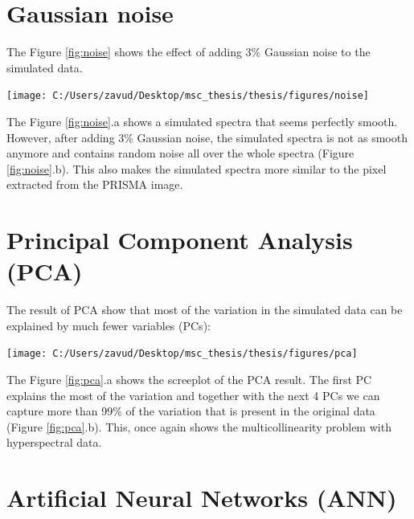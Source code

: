 \documentclass[a4paper, twoside]{templates/ociamthesis}
\let\origfigure\figure
\let\endorigfigure\endfigure
\renewenvironment{figure}[1][2] {
    \expandafter\origfigure\expandafter[H]
} {
    \endorigfigure
}
\begin{document}
\newpage

\hypertarget{gaussian-noise-1}{%
\section{Gaussian noise}\label{gaussian-noise-1}}

The Figure \ref{fig:noise} shows the effect of adding 3\% Gaussian noise to the simulated data.

\begin{figure}
\texttt{[image: C:/Users/zavud/Desktop/msc\_thesis/thesis/figures/noise]} \caption{Effect of adding $3\%$ Gaussian noise to the simulated spectra. The randomly chosen pixel from the PRISMA data was plotted to illustrate the noise found typically in the image}\label{fig:noise}
\end{figure}

The Figure \ref{fig:noise}.a shows a simulated spectra that seems perfectly smooth. However, after adding 3\% Gaussian noise, the simulated spectra is not as smooth anymore and contains random noise all over the whole spectra (Figure \ref{fig:noise}.b). This also makes the simulated spectra more similar to the pixel extracted from the PRISMA image.

\hypertarget{principal-component-analysis-pca-1}{%
\section{Principal Component Analysis (PCA)}\label{principal-component-analysis-pca-1}}

The result of PCA show that most of the variation in the simulated data can be explained by much fewer variables (PCs):

\begin{figure}
\texttt{[image: C:/Users/zavud/Desktop/msc\_thesis/thesis/figures/pca]} \caption{Principal Component Analysis: a) Screeplot, b) Cumulative variance explained by the first 5 PCs}\label{fig:pca}
\end{figure}

The Figure \ref{fig:pca}.a shows the screeplot of the PCA result. The first PC explains the most of the variation and together with the next 4 PCs we can capture more than 99\% of the variation that is present in the original data (Figure \ref{fig:pca}.b). This, once again shows the multicollinearity problem with hyperspectral data.

\newpage

\hypertarget{artificial-neural-networks-ann-1}{%
\section{Artificial Neural Networks (ANN)}\label{artificial-neural-networks-ann-1}}
\end{document}
